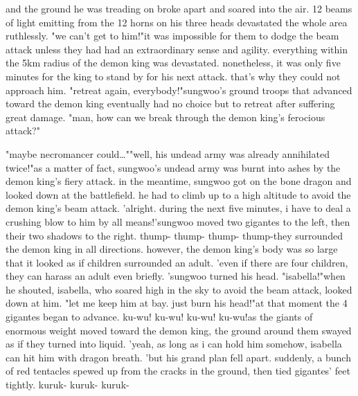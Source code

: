  and the ground he was treading on broke apart and soared into the air.
12 beams of light emitting from the 12 horns on his three heads devastated the whole area ruthlessly.
"we can't get to him!"it was impossible for them to dodge the beam attack unless they had had an extraordinary sense and agility.
everything within the 5km radius of the demon king was devastated.
 nonetheless, it was only five minutes for the king to stand by for his next attack.
 that's why they could not approach him.
"retreat again, everybody!"sungwoo's ground troops that advanced toward the demon king eventually had no choice but to retreat after suffering great damage.
"man, how can we break through the demon king's ferocious attack?"

"maybe necromancer could…""well, his undead army was already annihilated twice!"as a matter of fact, sungwoo's undead army was burnt into ashes by the demon king's fiery attack.
in the meantime, sungwoo got on the bone dragon and looked down at the battlefield.
he had to climb up to a high altitude to avoid the demon king's beam attack.
'alright.
 during the next five minutes, i have to deal a crushing blow to him by all means!'sungwoo moved two gigantes to the left, then their two shadows to the right.
thump- thump- thump- thump-they surrounded the demon king in all directions.
 however, the demon king's body was so large that it looked as if children surrounded an adult.
'even if there are four children, they can harass an adult even briefly.
'sungwoo turned his head.
"isabella!"when he shouted, isabella, who soared high in the sky to avoid the beam attack, looked down at him.
"let me keep him at bay.
 just burn his head!"at that moment the 4 gigantes began to advance.
 ku-wu! ku-wu! ku-wu! ku-wu!as the giants of enormous weight moved toward the demon king, the ground around them swayed as if they turned into liquid.
'yeah, as long as i can hold him somehow, isabella can hit him with dragon breath.
'but his grand plan fell apart.
 suddenly, a bunch of red tentacles spewed up from the cracks in the ground, then tied gigantes' feet tightly.
kuruk- kuruk- kuruk-

 